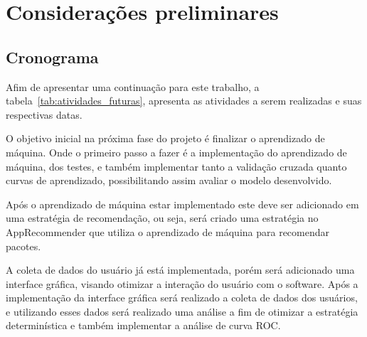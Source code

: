 \chapter[Considerações preliminares]{Considerações preliminares}

\section{Cronograma}

Afim de apresentar uma continuação para este trabalho, a tabela~\ref{tab:atividades_futuras},
apresenta as atividades a serem realizadas e suas respectivas datas.

\begin{table}[h]
\centering
{}
\caption{Atividades a serem realizadas}
\label{tab:atividades_futuras}
\end{table}

O objetivo inicial na próxima fase do projeto é finalizar o aprendizado
de máquina. Onde o primeiro passo a fazer é a implementação do aprendizado
de máquina, dos testes, e também implementar tanto a validação cruzada quanto
curvas de aprendizado, possibilitando assim avaliar o modelo desenvolvido.

Após o aprendizado de máquina estar implementado este deve ser adicionado
em uma estratégia de recomendação, ou seja, será criado uma estratégia
no AppRecommender que utiliza o aprendizado de máquina para recomendar
pacotes.

A coleta de dados do usuário já está implementada, porém será adicionado
uma interface gráfica, visando otimizar a interação do usuário com o
software. Após a implementação da interface gráfica será realizado a
coleta de dados dos usuários, e utilizando esses dados será realizado
uma análise a fim de otimizar a estratégia determinística e também
implementar a análise de curva ROC.

